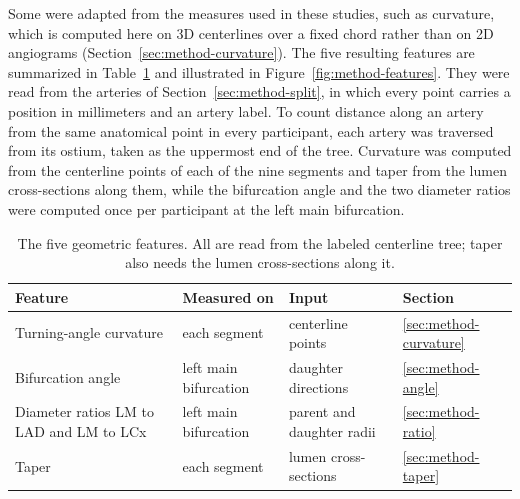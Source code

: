 Some were adapted from the measures used in these studies, such as curvature, which is computed here on 3D centerlines over a fixed chord rather than on 2D angiograms (Section~\ref{sec:method-curvature}).
The five resulting features are summarized in Table~\ref{tab:method-features} and illustrated in Figure~\ref{fig:method-features}.
They were read from the arteries of Section~\ref{sec:method-split}, in which every point carries a position in millimeters and an artery label.
To count distance along an artery from the same anatomical point in every participant, each artery was traversed from its ostium, taken as the uppermost end of the tree.
Curvature was computed from the centerline points of each of the nine segments and taper from the lumen cross-sections along them, while the bifurcation angle and the two diameter ratios were computed once per participant at the left main bifurcation.

\begin{table}[htbp]
  \centering
  \caption{The five geometric features. All are read from the labeled centerline tree; taper also needs the lumen cross-sections along it.}
  \label{tab:method-features}
  \begin{tabular}{llll}
    \toprule
    Feature & Measured on & Input & Section \\
    \midrule
    Turning-angle curvature & each segment & centerline points & \ref{sec:method-curvature} \\
    Bifurcation angle & left main bifurcation & daughter directions & \ref{sec:method-angle} \\
    Diameter ratios LM to LAD and LM to LCx & left main bifurcation & parent and daughter radii & \ref{sec:method-ratio} \\
    Taper & each segment & lumen cross-sections & \ref{sec:method-taper} \\
    \bottomrule
  \end{tabular}
\end{table}

